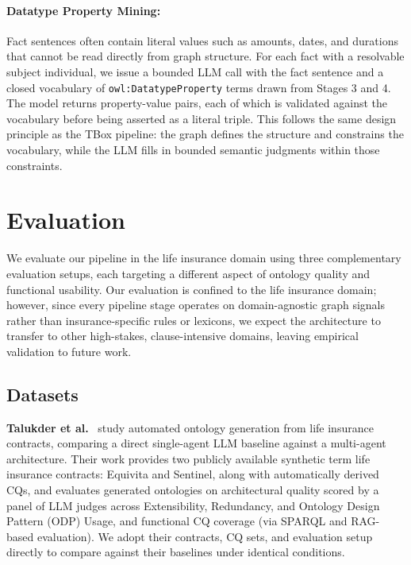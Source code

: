 \documentclass[sigconf]{acmart}
\begin{document}
\vspace{-0.5em}
\paragraph{\textbf{Datatype Property Mining:}}
Fact sentences often contain literal values such as amounts, dates, and durations that cannot be read directly from graph structure. For each fact with a resolvable subject individual, we issue a bounded LLM call with the fact sentence and a closed vocabulary of \texttt{owl:DatatypeProperty} terms drawn from Stages 3 and 4. The model returns property-value pairs, each of which is validated against the vocabulary before being asserted as a literal triple. This follows the same design principle as the TBox pipeline: the graph defines the structure and constrains the vocabulary, while the LLM fills in bounded semantic judgments within those constraints.



\section{Evaluation}

We evaluate our pipeline in the life insurance domain using three complementary evaluation setups, each targeting a different aspect of ontology quality and functional usability. Our evaluation is confined to the life insurance domain; however, since every pipeline stage operates on domain-agnostic graph signals rather than insurance-specific rules or lexicons, we expect the architecture to transfer to other high-stakes, clause-intensive domains, leaving empirical validation to future work.

\subsection{Datasets}

\textbf{Talukder et al.}~\cite{talukder2026towards} study automated ontology generation from life insurance contracts, comparing a direct single-agent LLM baseline against a multi-agent architecture. Their work provides two publicly available synthetic term life insurance contracts: Equivita and Sentinel, along with automatically derived CQs, and evaluates generated ontologies on architectural quality scored by a panel of LLM judges across Extensibility, Redundancy, and Ontology Design Pattern (ODP) Usage, and functional CQ coverage (via SPARQL and RAG-based evaluation). We adopt their contracts, CQ sets, and evaluation setup directly to compare against their baselines under identical conditions.
\end{document}
